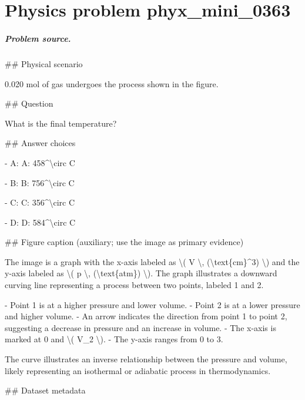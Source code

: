
\chapter{Physics problem phyx\_mini\_0363}
\label{ch:PhyXMiniProblems_problem_phyx_mini_0363}

\paragraph{Problem source.}
\#\# Physical scenario

0.020 mol of gas undergoes the process shown in the figure.

\#\# Question

What is the final temperature?

\#\# Answer choices

- A: A: 458\textasciicircum{}\textbackslash{}circ C

- B: B: 756\textasciicircum{}\textbackslash{}circ C

- C: C: 356\textasciicircum{}\textbackslash{}circ C

- D: D: 584\textasciicircum{}\textbackslash{}circ C

\#\# Figure caption (auxiliary; use the image as primary evidence)

The image is a graph with the x-axis labeled as \textbackslash{}( V \textbackslash{}, (\textbackslash{}text\{cm\}\textasciicircum{}3) \textbackslash{}) and the y-axis labeled as \textbackslash{}( p \textbackslash{}, (\textbackslash{}text\{atm\}) \textbackslash{}). The graph illustrates a downward curving line representing a process between two points, labeled 1 and 2.

- Point 1 is at a higher pressure and lower volume.
- Point 2 is at a lower pressure and higher volume.
- An arrow indicates the direction from point 1 to point 2, suggesting a decrease in pressure and an increase in volume.
- The x-axis is marked at 0 and \textbackslash{}( V\_2 \textbackslash{}).
- The y-axis ranges from 0 to 3.

The curve illustrates an inverse relationship between the pressure and volume, likely representing an isothermal or adiabatic process in thermodynamics.

\#\# Dataset metadata

